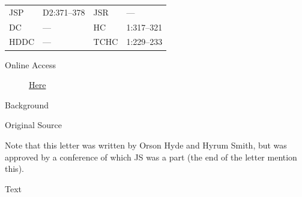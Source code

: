				\begin{tabular}{p{0.5in}p{1in}p{0.5in}p{1in}}
				JSP	 	& D2:371--378		& JSR 		& --- \\
				DC	 	& --- 				& HC 		& 1:317--321 \\
				HDDC 	& ---				& TCHC 		& 1:229--233 \\
				\end{tabular}
			
			\begin{description}
				\item[Online Access] \href{https://www.josephsmithpapers.org/paper-summary/letter-to-edward-partridge-and-others-14-january-1833/1}{Here}
			\end{description}
			
			\begin{description}
				\item[Background]
			\end{description}
			
			
			\begin{description}
				\item[Original Source]
			\end{description}
			
				Note that this letter was written by Orson Hyde and Hyrum Smith, but was approved by a conference of which JS was a part (the end of the letter mention this).
			
			
			\begin{description}
				\item[Text]
			\end{description}
			
